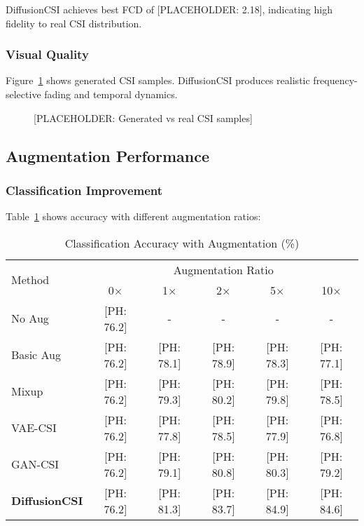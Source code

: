 \documentclass[journal]{IEEEtran}
\begin{document}
DiffusionCSI achieves best FCD of [PLACEHOLDER: 2.18], indicating high fidelity to real CSI distribution.

\subsubsection{Visual Quality}
Figure~\ref{fig:samples} shows generated CSI samples. DiffusionCSI produces realistic frequency-selective fading and temporal dynamics.

\begin{figure}[h]
\centering
\caption{[PLACEHOLDER: Generated vs real CSI samples]}
\label{fig:samples}
\end{figure}

\subsection{Augmentation Performance}

\subsubsection{Classification Improvement}
Table~\ref{tab:classification} shows accuracy with different augmentation ratios:

\begin{table}[h]
\centering
\caption{Classification Accuracy with Augmentation (\%)}
\label{tab:classification}
\begin{tabular}{lccccc}
\toprule
\multirow{2}{*}{Method} & \multicolumn{5}{c}{Augmentation Ratio} \\
\cmidrule{2-6}
& 0× & 1× & 2× & 5× & 10× \\
\midrule
No Aug & [PH: 76.2] & - & - & - & - \\
Basic Aug & [PH: 76.2] & [PH: 78.1] & [PH: 78.9] & [PH: 78.3] & [PH: 77.1] \\
Mixup & [PH: 76.2] & [PH: 79.3] & [PH: 80.2] & [PH: 79.8] & [PH: 78.5] \\
VAE-CSI & [PH: 76.2] & [PH: 77.8] & [PH: 78.5] & [PH: 77.9] & [PH: 76.8] \\
GAN-CSI & [PH: 76.2] & [PH: 79.1] & [PH: 80.8] & [PH: 80.3] & [PH: 79.2] \\
\textbf{DiffusionCSI} & [PH: 76.2] & [PH: 81.3] & [PH: 83.7] & [PH: 84.9] & [PH: 84.6] \\
\bottomrule
\end{tabular}
\end{table}
\end{document}
